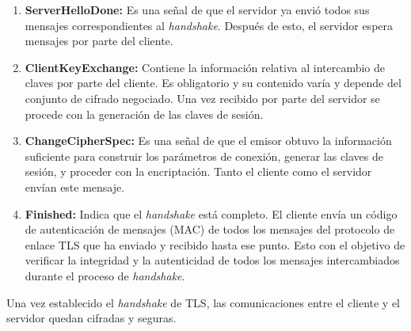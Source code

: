 \begin{enumerate}
    \item \textbf{ServerHelloDone: }Es una señal de que el servidor ya envió todos sus mensajes correspondientes al \textit{handshake}. Después de esto, el servidor espera mensajes por parte del cliente.

    \item \textbf{ClientKeyExchange: }Contiene la información relativa al intercambio de claves por parte del cliente. Es obligatorio y su contenido varía y depende del conjunto de cifrado negociado. Una vez recibido por parte del servidor se procede con la generación de las claves de sesión.

    \item \textbf{ChangeCipherSpec: }Es una señal de que el emisor obtuvo la información suficiente para construir los parámetros de conexión, generar las claves de sesión, y proceder con la encriptación. Tanto el cliente como el servidor envían este mensaje.

    \item \textbf{Finished: }Indica que el \textit{handshake} está completo. El cliente envía un código de autenticación de mensajes (MAC) \cite{bellare1996keying, stallings2005cryptography} de todos los mensajes del protocolo de enlace TLS que ha enviado y recibido hasta ese punto. Esto con el objetivo de verificar la integridad y la autenticidad de todos los mensajes intercambiados durante el proceso de \textit{handshake}.
\end{enumerate}

Una vez establecido el \textit{handshake} de TLS, las comunicaciones entre el cliente y el servidor quedan cifradas y seguras.


